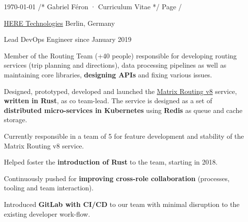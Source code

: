 \documentclass[10pt, a4paper]{awesome-cv}
\begin{document}
\raggedright

\makecvheader

\makecvfooter
{\today}
{/* Gabriel Féron · Curriculum Vitae */}
{Page \thepage /\pageref{LastPage}}

\begin{cventries}
	\cventrytitle
	{\href{https://developer.here.com}{HERE Technologies}}
	{Berlin, Germany}

	\cventry
	{Lead DevOps Engineer}
	{since January 2019}
	{
		\begin{cvparagraph}
			Member of the Routing Team (+40 people) responsible for developing routing services (trip planning and directions), data processing pipelines as well as maintaining core libraries, \textbf{designing APIs} and fixing various issues.
		\end{cvparagraph}
		\begin{cvitems}
			\item {Designed, prototyped, developed and launched the \href{https://developer.here.com/documentation/large-matrix/api-reference-swagger.html}{Matrix Routing v8} service, \textbf{written in Rust}, as co team-lead.
			            The service is designed as a set of \textbf{distributed micro-services in Kubernetes} using \textbf{Redis} as queue and cache storage.}
			\item {Currently responsible in a team of 5 for feature development and stability of the Matrix Routing v8 service.}
			\item {Helped foster the \textbf{introduction of Rust} to the team, starting in 2018.}
			\item {Continuously pushed for \textbf{improving cross-role collaboration} (processes, tooling and team interaction).}
			\item {Introduced \textbf{GitLab with CI/CD} to our team with minimal disruption to the existing developer work-flow.}
		\end{cvitems}
	}


\end{cventries}
\end{document}

